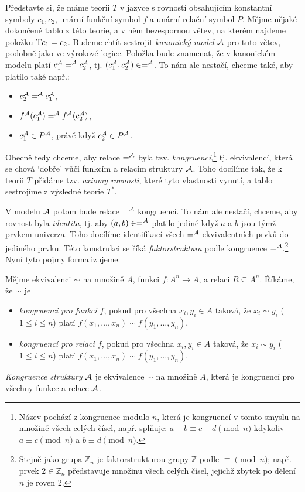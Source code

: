 Představte si, že máme teorii $T$ v jazyce s rovností obsahujícím konstantní symboly $c_1,c_2$, unární funkční symbol $f$ a unární relační symbol $P$. Mějme nějaké dokončené tablo z této teorie, a v něm bezespornou větev, na kterém najdeme položku $\mathrm{T} c_1=c_2$. Budeme chtít sestrojit \emph{kanonický model} $\mathcal{A}$ pro tuto větev, podobně jako ve výrokové logice. Položka bude znamenat, že v kanonickém modelu platí $c_1^{\mathcal{A}} =^{\mathcal{A}} c_2^{\mathcal{A}}$, tj. $(c_1^{\mathcal{A}},c_2^{\mathcal{A}})\in =^{\mathcal{A}}$. To nám ale nestačí, chceme také, aby platilo také např.:
\begin{itemize}
    \item $c_2^{\mathcal{A}} =^{\mathcal{A}} c_1^{\mathcal{A}}$,
    \item $f^{\mathcal{A}}(c_1^{\mathcal{A}}) =^{\mathcal{A}} f^{\mathcal{A}}(c_2^{\mathcal{A}})$,
    \item $c_1^{\mathcal{A}}\in P^{\mathcal{A}}$, právě když $c_2^{\mathcal{A}}\in P^{\mathcal{A}}$.
\end{itemize}
Obecně tedy chceme, aby relace $=^{\mathcal{A}}$ byla tzv. \emph{kongruencí},\footnote{Název pochází z kongruence modulo $n$, která je kongruencí v tomto smyslu na množině všech celých čísel, např. splňuje: $a+b\equiv c+d\pmod n$ kdykoliv $a\equiv c\pmod n$ a $b\equiv d\pmod n$.} tj. ekvivalencí, která se chová `dobře' vůči funkcím a relacím struktury $\mathcal{A}$. Toho docílíme tak, že k teorii $T$ přidáme tzv. \emph{axiomy rovnosti}, které tyto vlastnosti vynutí, a tablo sestrojíme z výsledné teorie $T^*$.

V modelu $\mathcal{A}$ potom bude relace $=^{\mathcal{A}}$ kongruencí. To nám ale nestačí, chceme, aby rovnost byla \emph{identita}, tj. aby $(a,b)\in=^{\mathcal{A}}$ platilo jedině když $a$ a $b$ jsou týmž prvkem univerza. Toho docílíme identifikací všech $=^{\mathcal{A}}$-ekvivalentních prvků do jediného prvku. Této konstrukci se říká \emph{faktorstruktura} podle kongruence $=^{\mathcal{A}}$.\footnote{Stejně jako grupa $\mathbb Z_n$ je faktorstrukturou grupy $\mathbb Z$ podle $\equiv\pmod n$; např. prvek $2\in\mathbb Z_n$ představuje množinu všech celých čísel, jejichž zbytek po dělení $n$ je roven 2.} Nyní tyto pojmy formalizujeme.

\begin{definition}[Kongruence]
    Mějme ekvivalenci $\sim$ na množině $A$, funkci $f\colon A^n\to A$, a relaci $R\subseteq A^n$. Říkáme, že $\sim$ je
    \begin{itemize}
        \item \emph{kongruencí pro funkci $f$}, pokud pro všechna $x_i,y_i\in A$ taková, že $x_i\sim y_i$ ($1\leq i\leq n$) platí $f(x_1,\dots,x_n)\sim f(y_1,\dots,y_n)$,
        \item \emph{kongruencí pro relaci $f$}, pokud pro všechna $x_i,y_i\in A$ taková, že $x_i\sim y_i$ ($1\leq i\leq n$) platí $f(x_1,\dots,x_n)\sim f(y_1,\dots,y_n)$.
    \end{itemize}    
    \emph{Kongruence struktury} $\mathcal{A}$ je ekvivalence $\sim$ na množině $A$, která je kongruencí pro všechny funkce a relace $\mathcal{A}$. 
\end{definition}

